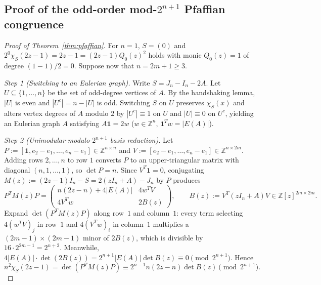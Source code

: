 \documentclass[11pt,reqno]{amsart}
\theoremstyle{definition}
\theoremstyle{remark}
\numberwithin{equation}{section}
\numberwithin{table}{section}
\begin{document}
\subsection{Proof of the odd-order \texorpdfstring{mod-$2^{n+1}$}{mod-2^(n+1)} Pfaffian congruence}
\begin{proof}[Proof of Theorem~\ref{thm:pfaffian}]
For $n = 1$, $S = (0)$ and $2^0 \chi_S(2z - 1) = 2z - 1 = (2z - 1)Q_0(z)^2$ holds with monic $Q_0(z) = 1$ of degree $(1 - 1)/2 = 0$. Suppose now that $n = 2m + 1 \ge 3$.

\emph{Step 1 (Switching to an Eulerian graph).} Write $S = J_n - I_n - 2A$. Let $U \subseteq \{1, \dots, n\}$ be the set of odd-degree vertices of $A$. By the handshaking lemma, $|U|$ is even and $|U^c| = n - |U|$ is odd. Switching $S$ on $U$ preserves $\chi_S(x)$ and alters vertex degrees of $A$ modulo $2$ by $|U^c| \equiv 1$ on $U$ and $|U| \equiv 0$ on $U^c$, yielding an Eulerian graph $A$ satisfying $A\mathbf{1} = 2w$ ($w \in \mathbb{Z}^n$, $\mathbf{1}^T w = |E(A)|$).

\emph{Step 2 (Unimodular-modulo-$2^{n+1}$ basis reduction).} Let $P := [\mathbf{1}, e_2 - e_1, \dots, e_n - e_1] \in \mathbb{Z}^{n \times n}$ and $V := [e_2 - e_1, \dots, e_n - e_1] \in \mathbb{Z}^{n \times 2m}$. Adding rows $2, \dots, n$ to row $1$ converts $P$ to an upper-triangular matrix with diagonal $(n, 1, \dots, 1)$, so $\det P = n$. Since $V^T \mathbf{1} = 0$, conjugating $M(z) := (2z - 1)I_n - S = 2(zI_n + A) - J_n$ by $P$ produces
\[
  P^T M(z) P = \begin{pmatrix} n(2z - n) + 4|E(A)| & 4 w^T V \\ 4 V^T w & 2 B(z) \end{pmatrix}, \qquad B(z) := V^T(zI_n + A)V \in \mathbb{Z}[z]^{2m \times 2m}.
\]
Expand $\det(P^T M(z) P)$ along row~$1$ and column~$1$: every term selecting $4(w^T V)_j$ in row~$1$ and $4(V^T w)_i$ in column~$1$ multiplies a $(2m - 1) \times (2m - 1)$ minor of $2B(z)$, which is divisible by $16 \cdot 2^{2m-1} = 2^{n+2}$. Meanwhile, $4|E(A)| \cdot \det(2B(z)) = 2^{n+1}|E(A)|\det B(z) \equiv 0 \pmod{2^{n+1}}$. Hence
\begin{equation}\label{eq:full_laplace}
  n^2 \chi_S(2z - 1) = \det(P^T M(z) P) \equiv 2^{n-1} n(2z - n) \det B(z) \pmod{2^{n+1}}.
\end{equation}


\end{proof}
\end{document}
